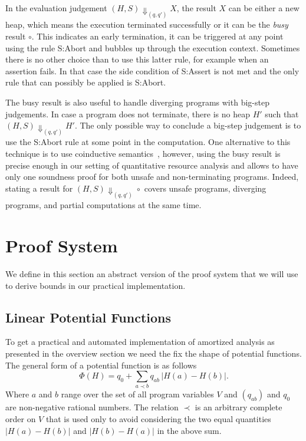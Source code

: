 \documentclass[nocopyrightspace,preprint]{sigplanconf}
\begin{document}
In the evaluation judgement $(H, S) \Downarrow_{(q, q')} X$, the result $X$ can
be either a new heap, which means the execution terminated successfully
or it can be the \emph{busy} result $\circ$.  This indicates an early
termination, it can be triggered at any point using the rule {\sc S:Abort}
and bubbles up through the execution context.
Sometimes there is no other choice than to use this latter rule, for
example when an assertion fails.  In that case the side condition of
{\sc S:Assert} is not met and the only rule that can possibly be applied
is {\sc S:Abort}.

The busy result is also useful to handle diverging programs with big-step
judgements.  In case a program does not terminate, there is no heap $H'$
such that $(H, S)\Downarrow_{(q, q')} H'$.  The only possible way to
conclude a big-step judgement is to use the {\sc S:Abort} rule at some
point in the computation.  One alternative to this technique is to use
coinductive semantics~\cite{Leroy-coind}, however, using the busy
result is precise enough in our setting of quantitative resource analysis and
allows to have only one soundness proof for both unsafe and
non-terminating programs.  Indeed, stating a result for
$(H, S) \Downarrow_{(q,q')} \circ$ covers unsafe programs, diverging
programs, and partial computations at the same time.


\section{Proof System}

We define in this section an abstract version of the proof system that
we will use to derive bounds in our practical implementation.

\subsection{Linear Potential Functions}

To get a practical and automated implementation of amortized analysis
as presented in the overview section we need the fix the shape of
potential functions.  The general form of a potential function is as follows
$$
\Phi(H) = q_0 + \sum_{a \prec b} q_{ab}\,|H(a) - H(b)|.
$$
Where $a$ and $b$ range over the set of all program variables $V$ and
$(q_{ab})$ and $q_0$ are non-negative rational numbers.  The relation
$\prec$ is an arbitrary complete order on $V$ that is used only to
avoid considering the two equal quantities $|H(a) - H(b)|$ and
$|H(b) - H(a)|$ in the above sum.
\end{document}
